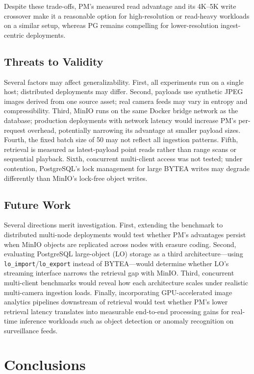 \documentclass[conference]{IEEEtran}
\begin{document}
Despite these trade-offs, PM's measured read advantage and its 4K--5K write crossover make it a reasonable option for high-resolution or read-heavy workloads on a similar setup, whereas PG remains compelling for lower-resolution ingest-centric deployments.

\subsection{Threats to Validity}
Several factors may affect generalizability. First, all experiments run on a single host; distributed deployments may differ. Second, payloads use synthetic JPEG images derived from one source asset; real camera feeds may vary in entropy and compressibility. Third, MinIO runs on the same Docker bridge network as the database; production deployments with network latency would increase PM's per-request overhead, potentially narrowing its advantage at smaller payload sizes. Fourth, the fixed batch size of 50 may not reflect all ingestion patterns. Fifth, retrieval is measured as latest-payload point reads rather than range scans or sequential playback. Sixth, concurrent multi-client access was not tested; under contention, PostgreSQL's lock management for large BYTEA writes may degrade differently than MinIO's lock-free object writes.

\subsection{Future Work}
Several directions merit investigation. First, extending the benchmark to distributed multi-node deployments would test whether PM's advantages persist when MinIO objects are replicated across nodes with erasure coding. Second, evaluating PostgreSQL large-object (LO) storage as a third architecture---using \texttt{lo\_import}/\texttt{lo\_export} instead of BYTEA---would determine whether LO's streaming interface narrows the retrieval gap with MinIO. Third, concurrent multi-client benchmarks would reveal how each architecture scales under realistic multi-camera ingestion loads. Finally, incorporating GPU-accelerated image analytics pipelines downstream of retrieval would test whether PM's lower retrieval latency translates into measurable end-to-end processing gains for real-time inference workloads such as object detection or anomaly recognition on surveillance feeds.

\section{Conclusions}
\label{sec:conclusions}
\end{document}
